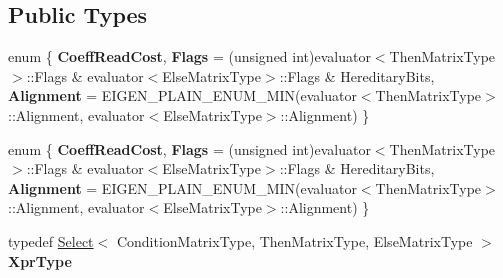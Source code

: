 \subsection*{Public Types}
\begin{DoxyCompactItemize}
\item 
\mbox{\label{struct_eigen_1_1internal_1_1evaluator_3_01_select_3_01_condition_matrix_type_00_01_then_matrix_t0c555ecce04e199df0b1ebada3749ccc_a996bc5c53596ed87c6241d6d5627f8f4}} 
enum \{ {\bfseries Coeff\+Read\+Cost}, 
{\bfseries Flags} = (unsigned int)evaluator$<$Then\+Matrix\+Type$>$\+:\+:Flags \& evaluator$<$Else\+Matrix\+Type$>$\+:\+:Flags \& Hereditary\+Bits, 
{\bfseries Alignment} = E\+I\+G\+E\+N\+\_\+\+P\+L\+A\+I\+N\+\_\+\+E\+N\+U\+M\+\_\+\+M\+IN(evaluator$<$Then\+Matrix\+Type$>$\+:\+:Alignment, evaluator$<$Else\+Matrix\+Type$>$\+:\+:Alignment)
 \}
\item 
\mbox{\label{struct_eigen_1_1internal_1_1evaluator_3_01_select_3_01_condition_matrix_type_00_01_then_matrix_t0c555ecce04e199df0b1ebada3749ccc_a07cbeeaf36d49275497dea05602bbe42}} 
enum \{ {\bfseries Coeff\+Read\+Cost}, 
{\bfseries Flags} = (unsigned int)evaluator$<$Then\+Matrix\+Type$>$\+:\+:Flags \& evaluator$<$Else\+Matrix\+Type$>$\+:\+:Flags \& Hereditary\+Bits, 
{\bfseries Alignment} = E\+I\+G\+E\+N\+\_\+\+P\+L\+A\+I\+N\+\_\+\+E\+N\+U\+M\+\_\+\+M\+IN(evaluator$<$Then\+Matrix\+Type$>$\+:\+:Alignment, evaluator$<$Else\+Matrix\+Type$>$\+:\+:Alignment)
 \}
\item 
\mbox{\label{struct_eigen_1_1internal_1_1evaluator_3_01_select_3_01_condition_matrix_type_00_01_then_matrix_t0c555ecce04e199df0b1ebada3749ccc_a78436c5edc9cca577b62054c11c57e19}} 
typedef \hyperlink{group___core___module_class_eigen_1_1_select}{Select}$<$ Condition\+Matrix\+Type, Then\+Matrix\+Type, Else\+Matrix\+Type $>$ {\bfseries Xpr\+Type}
\item 
\mbox{\label{struct_eigen_1_1internal_1_1evaluator_3_01_select_3_01_condition_matrix_type_00_01_then_matrix_t0c555ecce04e199df0b1ebada3749ccc_a94a05fa6ddffcd5bd61ee55940770ebc}} 

\end{DoxyCompactItemize}
